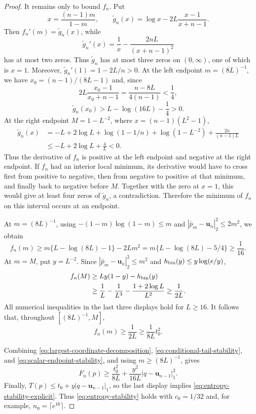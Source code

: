 \begin{proof}
It remains only to bound \(f_n\). Put
\[
  x=\frac{(n-1)m}{1-m},
  \qquad
  \widetilde g_n(x)=\log x-2L\frac{x-1}{x+n-1}.
\]
Then \(f_n'(m)=\widetilde g_n(x)\), while
\[
  \widetilde g_n'(x)=\frac1x-\frac{2nL}{(x+n-1)^2}
\]
has at most two zeros. Thus \(\widetilde g_n\) has at most three zeros on
\((0,\infty)\), one of which is \(x=1\). Moreover,
\(\widetilde g_n'(1)=1-2L/n>0\). At the left endpoint
\(m=(8L)^{-1}\), we have \(x_0=(n-1)/(8L-1)\) and, since
\[
  2L\frac{x_0-1}{x_0+n-1}=\frac{n-8L}{4(n-1)}<\frac14,
\]
\[
  \widetilde g_n(x_0)
  >L-\log(16L)-\frac14>0.
\]
At the right endpoint
\(M=1-L^{-2}\), where \(x=(n-1)(L^2-1)\),
\begin{align*}
  \widetilde g_n(x)
  &=-L+2\log L+\log(1-1/n)+\log(1-L^{-2})
       +\frac{2n}{(n-1)L}\\
  &\le-L+2\log L+\frac4L<0.
\end{align*}
Thus the derivative of \(f_n\) is positive at the left endpoint and
negative at the right endpoint. If \(f_n\) had an interior local minimum,
its derivative would have to cross first from positive to negative, then
from negative to positive at that minimum, and finally back to negative
before \(M\). Together with the zero at \(x=1\), this would give at least
four zeros of \(\widetilde g_n\), a contradiction. Therefore the minimum
of \(f_n\) on this interval occurs at an endpoint.

At \(m=(8L)^{-1}\), using
\(-(1-m)\log(1-m)\le m\) and
\(|\bar p_m-\mathbf u_n|_2^2\le2m^2\), we obtain
\[
  f_n(m)
  \ge m\{L-\log(8L)-1\}-2Lm^2
  =m\{L-\log(8L)-5/4\}
  \ge\frac1{16}.
\]
At \(m=M\), put \(y=L^{-2}\). Since
\(|\bar p_m-\mathbf u_n|_2^2\le m^2\) and
\(h_{\rm bin}(y)\le y\log(e/y)\),
\begin{align*}
  f_n(M)
  &\ge Ly(1-y)-h_{\rm bin}(y)\\
  &\ge \frac1L-\frac1{L^3}-\frac{1+2\log L}{L^2}
  \ge\frac1{2L}.
\end{align*}
All numerical inequalities in the last three displays hold for \(L\ge16\).
It follows that, throughout \([(8L)^{-1},M]\),
\begin{equation}
\label{eq:scalar-endpoint-stability}
  f_n(m)\ge\frac1{2L}\ge\frac1{8L}t_0^2.
\end{equation}

Combining \eqref{eq:largest-coordinate-decomposition},
\eqref{eq:conditional-tail-stability}, and
\eqref{eq:scalar-endpoint-stability}, and using
\(m\ge(8L)^{-1}\), gives
\[
  F_n(p)
  \ge\frac{t_0^2}{8L}
      +\frac{y^2}{16L}|q-\mathbf u_{n-1}|_1^2.
\]
Finally,
\(T(p)\le t_0+y|q-\mathbf u_{n-1}|_1\), so the last display implies
\eqref{eq:entropy-stability-explicit}. Thus
\eqref{eq:entropy-stability} holds with \(c_0=1/32\) and, for example,
\(n_0=\lceil e^{16}\rceil\).
\end{proof}

